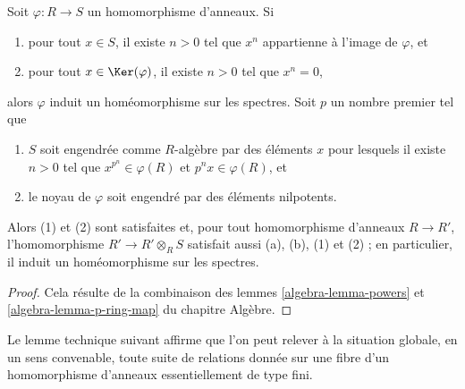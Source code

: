 \begin{lemma}
\label{lemma-p-ring-map}
Soit $\varphi : R \to S$ un homomorphisme d'anneaux. Si
\begin{enumerate}
\item pour tout $x \in S$, il existe $n > 0$ tel que
$x^n$ appartienne à l'image de $\varphi$, et
\item pour tout $x \in \Ker(\varphi)$, il existe $n > 0$
tel que $x^n = 0$,
\end{enumerate}
alors $\varphi$ induit un homéomorphisme sur les spectres. Soit
$p$ un nombre premier tel que
\begin{enumerate}
\item[(a)] $S$ soit engendrée comme $R$-algèbre par des éléments $x$ pour
lesquels il existe $n > 0$ tel que $x^{p^n} \in \varphi(R)$ et
$p^nx \in \varphi(R)$, et
\item[(b)] le noyau de $\varphi$ soit engendré par des éléments nilpotents.
\end{enumerate}
Alors (1) et (2) sont satisfaites et, pour tout homomorphisme d'anneaux $R \to R'$,
l'homomorphisme $R' \to R' \otimes_R S$ satisfait aussi (a), (b), (1) et (2) ;
en particulier, il induit un homéomorphisme sur les spectres.
\end{lemma}

\begin{proof}
Cela résulte de la combinaison des lemmes
\ref{algebra-lemma-powers} et \ref{algebra-lemma-p-ring-map} du chapitre Algèbre.
\end{proof}

\noindent
Le lemme technique suivant affirme que l'on peut relever à la situation globale,
en un sens convenable, toute suite de relations donnée sur une fibre d'un
homomorphisme d'anneaux essentiellement de type fini.

